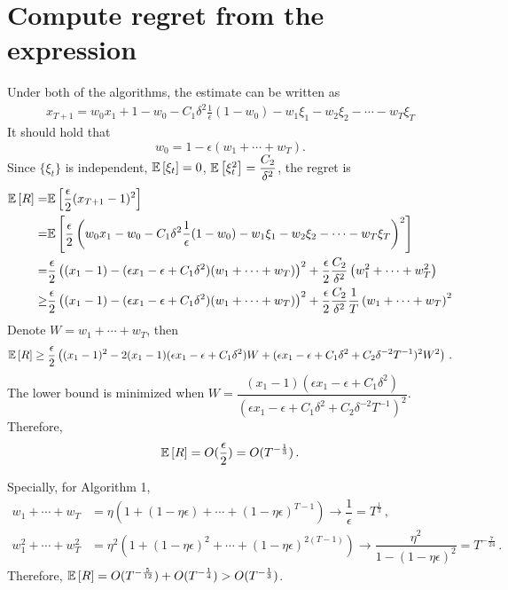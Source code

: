 \documentclass[11pt,letterpaper,english]{article}
\begin{document}
\section{Compute regret from the expression}
Under both of the algorithms, the estimate can be written as
\begin{align*}
x_{T+1} = w_0 x_1 + 1-w_0 -C_1 \delta^2 \frac{1}{\epsilon}(1-w_0) -w_1 \xi_1 - w_2 \xi_2 - \cdots - w_T \xi_T
\end{align*}
It should hold that 
\[w_0 = 1-\epsilon (w_1+\cdots+w_T).\]
Since $\{\xi_t\}$ is independent, $\mathbb{E}\left[\xi_t\right]=0$, $\mathbb{E}\left[\xi_t^2\right]=\dfrac{C_2}{\delta^2}$, 
the regret is
\begin{align*}
\mathbb{E}\left[R\right] =&\mathbb{E}\left[ \frac{\epsilon}{2} (x_{T+1}-1)^2\right]\\
=& \mathbb{E}\left[\frac{\epsilon}{2} \left(w_0 x_1 -w_0 -C_1 \delta^2 \frac{1}{\epsilon}(1-w_0) -w_1 \xi_1 - w_2 \xi_2 - \cdots - w_T \xi_T  \right)^2\right] \\
=& \dfrac{\epsilon}{2} \left( (x_1-1)-(\epsilon x_1 -\epsilon +C_1\delta^2)(w_1+\cdots+w_T) \right)^2 + \dfrac{\epsilon}{2} \dfrac{C_2}{\delta^2} \left(w_1^2+\cdots+w_T^2  \right) \\
\geq& \dfrac{\epsilon}{2} \left( (x_1-1)-(\epsilon x_1 -\epsilon +C_1\delta^2)(w_1+\cdots+w_T) \right)^2 + \dfrac{\epsilon}{2} \dfrac{C_2}{\delta^2}\dfrac{1}{T} \left(w_1+\cdots+w_T  \right)^2
\end{align*}
Denote $W = w_1+\cdots+w_T$, then 
\begin{align*}
\mathbb{E}\left[R\right] \geq  \dfrac{\epsilon}{2} \left( (x_1-1)^2-2(x_1-1)(\epsilon x_1-\epsilon +C_1 \delta^2)W + (\epsilon x_1-\epsilon +C_1 \delta^2+C_2 \delta^{-2}T^{-1})^2W^2  \right) \,.
\end{align*}
The lower bound is minimized when $W=\dfrac{(x_1-1)(\epsilon x_1-\epsilon +C_1 \delta^2)}{\left(\epsilon x_1-\epsilon +C_1 \delta^2+C_2 \delta^{-2}T^{-1}\right)^2} $. Therefore, 
\begin{align*}
\mathbb{E}\left[R\right] = O(\dfrac{\epsilon}{2}) = O(T^{-\frac{1}{3}})\,.
\end{align*}

Specially, for Algorithm 1, 
\begin{align*}
w_1+\cdots+w_T&= \eta \left( 1+(1-\eta \epsilon)+\cdots+(1-\eta \epsilon)^{T-1} \right)\to \dfrac{1}{\epsilon} =T^{\frac{1}{3}}\,,\\
w_1^2+\cdots+w_T^2&=\eta^2 \left( 1+(1-\eta \epsilon)^2+\cdots+(1-\eta \epsilon)^{2(T-1)} \right) \to \dfrac{\eta^2}{1-(1-\eta \epsilon)^2}= T^{-\frac{7}{24}}\,.
\end{align*}
Therefore, $\mathbb{E}\left[R\right] = O(T^{-\frac{5}{12}})+O(T^{-\frac{1}{4}})>O(T^{-\frac{1}{3}})$.
\end{document}
